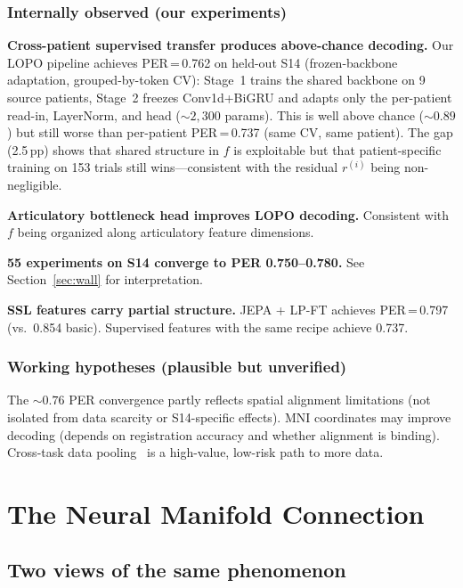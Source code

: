\documentclass[11pt,letterpaper]{article}
\begin{document}
\subsubsection{Internally observed (our experiments)}

\textbf{Cross-patient supervised transfer produces above-chance decoding.} Our LOPO pipeline achieves PER\,=\,0.762 on held-out S14 (frozen-backbone adaptation, grouped-by-token CV): Stage~1 trains the shared backbone on 9 source patients, Stage~2 freezes Conv1d+BiGRU and adapts only the per-patient read-in, LayerNorm, and head (${\sim}2{,}300$ params). This is well above chance (${\sim}0.89$) but still worse than per-patient PER\,=\,0.737 (same CV, same patient). The gap (2.5\,pp) shows that shared structure in $f$ is exploitable but that patient-specific training on 153 trials still wins---consistent with the residual $r^{(i)}$ being non-negligible.

\textbf{Articulatory bottleneck head improves LOPO decoding.} Consistent with $f$ being organized along articulatory feature dimensions.

\textbf{55 experiments on S14 converge to PER 0.750--0.780.} See Section~\ref{sec:wall} for interpretation.

\textbf{SSL features carry partial structure.} JEPA + LP-FT achieves PER\,=\,0.797 (vs.\ 0.854 basic). Supervised features with the same recipe achieve 0.737.

\subsubsection{Working hypotheses (plausible but unverified)}

The ${\sim}0.76$ PER convergence partly reflects spatial alignment limitations (not isolated from data scarcity or S14-specific effects). MNI coordinates may improve decoding (depends on registration accuracy and whether alignment is binding). Cross-task data pooling~\cite{duraivel2025} is a high-value, low-risk path to more data.


\section{The Neural Manifold Connection}\label{sec:manifold}

\subsection{Two views of the same phenomenon}
\end{document}
